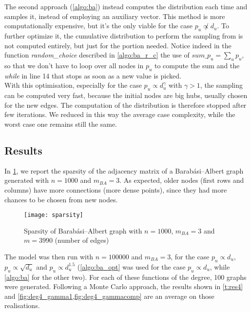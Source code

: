 The second approach (\cref{algo:ba}) instead computes the distribution each time and samples it, instead of employing an auxiliary vector. This method is more computationally expensive, but it's the only viable for the case $p_u \not\propto d_u$. To further optimize it, the cumulative distribution to perform the sampling from is not computed entirely, but just for the portion needed. Notice indeed in the function \textit{random\_choice} described in \cref{algo:ba_r_c} the use of $sum\_p_u=\sum_{u} p_u$, so that we don't have to loop over all nodes in $p_u$ to compute the sum and the \textit{while} in line 14 that stops as soon as a new value is picked.\\
With this optimisation, especially for the case $p_u \propto d_u^{\gamma}$ with $\gamma>1$, the sampling can be computed very fast, because the initial nodes are big hubs, usually chosen for the new edges. The computation of the distribution is therefore stopped after few iterations.
We reduced in this way the average case complexity, while the worst case one remains still the same.
 
\subsection{Results}
In \cref{fig:sparsity4}, we report the sparsity of the adjacency matrix of a Barabási–Albert graph generated with $n=1000$ and $m_{BA}=3$. As expected, older nodes (first rows and columns) have more connections (more dense points), since they had more chances to be chosen from new nodes.

\begin{figure} [!ht]
	\centering
	\texttt{[image: sparsity]}
	\caption{Sparsity of Barabási–Albert graph with $n=1000$, $m_{BA}=3$ and $m=3990$ (number of edges)}
	\label{fig:sparsity4}
\end{figure}
\pagebreak
The model was then run with $n=100000$ and $m_{BA}=3$, for the case $p_u \propto d_u$, $p_u \propto \sqrt{d_u}$ and $p_u \propto d_u^{1.5}$ (\cref{algo:ba_opt} was used for the case  $p_u \propto d_u$, while \cref{algo:ba} for the other two). For each of these functions of the degree, 100 graphs were generated. Following a Monte Carlo approach, the results shown in \cref{t:res4} and \cref{fig:deg4_gamma1,fig:deg4_gammacomp} are an average on those realisations.\\

